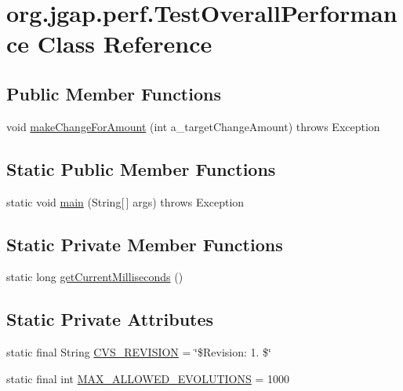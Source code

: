 \hypertarget{classorg_1_1jgap_1_1perf_1_1_test_overall_performance}{\section{org.\-jgap.\-perf.\-Test\-Overall\-Performance Class Reference}
\label{classorg_1_1jgap_1_1perf_1_1_test_overall_performance}
}
\subsection*{Public Member Functions}
\begin{DoxyCompactItemize}
\item 
void \hyperlink{classorg_1_1jgap_1_1perf_1_1_test_overall_performance_ad523e31281c890faf7e3cc883b2d2898}{make\-Change\-For\-Amount} (int a\-\_\-target\-Change\-Amount)  throws Exception 
\end{DoxyCompactItemize}
\subsection*{Static Public Member Functions}
\begin{DoxyCompactItemize}
\item 
static void \hyperlink{classorg_1_1jgap_1_1perf_1_1_test_overall_performance_a8a1f3db5c5abb3ae3788b4dc59e73491}{main} (String\mbox{[}$\,$\mbox{]} args)  throws Exception 
\end{DoxyCompactItemize}
\subsection*{Static Private Member Functions}
\begin{DoxyCompactItemize}
\item 
static long \hyperlink{classorg_1_1jgap_1_1perf_1_1_test_overall_performance_acc563ba735cdea009be0a1d6eba57fe3}{get\-Current\-Milliseconds} ()
\end{DoxyCompactItemize}
\subsection*{Static Private Attributes}
\begin{DoxyCompactItemize}
\item 
static final String \hyperlink{classorg_1_1jgap_1_1perf_1_1_test_overall_performance_ac41c91455d9fdd78203f0464c6c71727}{C\-V\-S\-\_\-\-R\-E\-V\-I\-S\-I\-O\-N} = \char`\"{}\$Revision\-: 1. \$\char`\"{}
\item 
static final int \hyperlink{classorg_1_1jgap_1_1perf_1_1_test_overall_performance_aa9b50c87546cbebd930aa4e91b4dfec6}{M\-A\-X\-\_\-\-A\-L\-L\-O\-W\-E\-D\-\_\-\-E\-V\-O\-L\-U\-T\-I\-O\-N\-S} = 1000
\end{DoxyCompactItemize}



